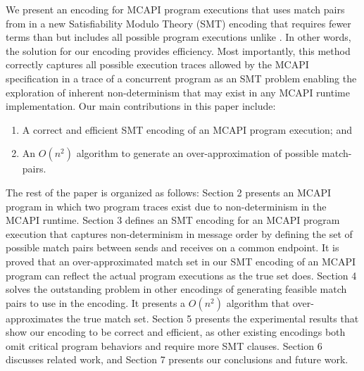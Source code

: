 We present an encoding for MCAPI program executions that uses match pairs from \cite{sharma:fmcad09} in a new Satisfiability Modulo Theory (SMT) encoding that requires fewer terms than \cite{elwakil:padtad10} but includes all possible program executions unlike \cite{elwakil:padtad10}. In other words, the solution for our encoding provides efficiency. Most importantly, this method correctly captures all possible execution traces allowed by the MCAPI specification in a trace of a concurrent program as an SMT problem enabling the exploration of inherent non-determinism that may exist in any MCAPI runtime implementation.
Our main contributions in this paper include:

\begin{enumerate}
\item A correct and efficient SMT encoding of an MCAPI program execution; and
\item  An $O(n^2)$ algorithm to generate an over-approximation of possible match-pairs.
\end{enumerate}

The rest of the paper is organized as follows:
Section 2 presents an MCAPI program in which two program traces exist due to non-determinism in the MCAPI runtime. Section 3 defines an SMT encoding for an MCAPI program execution that captures non-determinism in message order by defining the set of possible match pairs between sends and receives on a common endpoint. It is proved that an over-approximated match set in our SMT encoding of an MCAPI program can reflect the actual program executions as the true set does. Section 4 solves the outstanding problem in other encodings of generating feasible match pairs to use in the encoding. It presents a $O(n^2)$ algorithm that over-approximates the true match set. Section 5 presents the experimental results that show our encoding to be correct and efficient, as other existing encodings both omit critical program behaviors and require more SMT clauses. Section 6 discusses related
work, and Section 7  presents our conclusions and future work.


